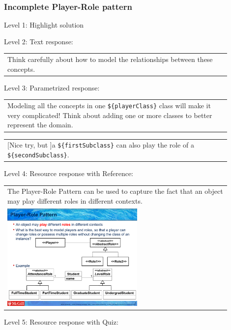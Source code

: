 \subsubsection{Incomplete Player-Role pattern}

\noindent Level 1: Highlight solution \medskip

\noindent Level 2: Text response: \medskip

\begin{tabular}{|p{0.9\linewidth}}
Think carefully about how to model the relationships between these concepts.
\end{tabular} \medskip

\noindent Level 3: Parametrized response: \medskip

\begin{tabular}{|p{0.9\linewidth}}
Modeling all the concepts in one \verb|${playerClass}| class will make it very complicated! Think about adding one or more classes to better represent the domain.
\end{tabular} \medskip

\begin{tabular}{|p{0.9\linewidth}}
[Nice try, but ]a \verb|${firstSubclass}| can also play the role of a \verb|${secondSubclass}|.
\end{tabular} \medskip

\noindent Level 4: Resource response with Reference: \medskip

\begin{tabular}{|p{0.9\linewidth}}
The Player-Role Pattern can be used to capture the fact that an object may play different roles
in different contexts.

\\
\includegraphics[width=0.6\textwidth]{images/player_role.png}
\end{tabular} \medskip

\noindent Level 5: Resource response with Quiz: \medskip


